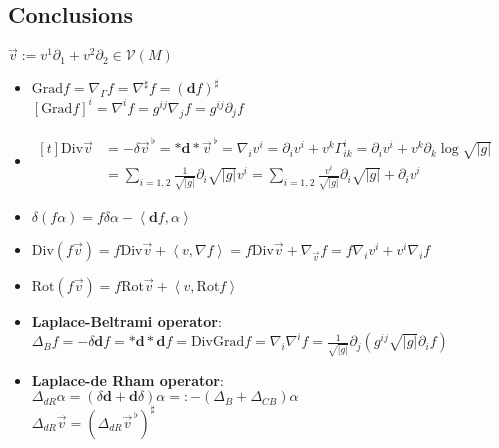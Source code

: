 \documentclass{scrartcl}
\newcommand{\exd}{\mathbf{d}}
\newcommand{\vecflat}[1]{\vec{#1}^{\,\flat}}
\begin{document}
    \subsection{Conclusions}
    \(  \vec{v} := v^{1}\partial_{1} + v^{2}\partial_{2}\in\mathcal{V}(M) \)
    \begin{itemize}
      \item \( \text{Grad}f = \nabla_{\Gamma}f = \nabla^{\sharp}f = \left( \exd f \right)^{\sharp} \)\\
            \( \left[  \text{Grad}f \right]^{i} = \nabla^{i}f =g^{ij}\nabla_{j} f = g^{ij}\partial_{j}f \)
      \item \(
        \begin{aligned}[t]
            \text{Div}\vec{v} &= -\delta\vecflat{v} = *\exd * \vecflat{v} = \nabla_{i}v^{i}
                               = \partial_{i}v^{i} + v^{k}\Gamma_{ik}^{i} 
                               = \partial_{i}v^{i} + v^{k}\partial_{k}\log\sqrt{|g|}\\
                                 &= \sum_{i=1,2} \frac{1}{\sqrt{|g|}}\partial_{i} \sqrt{|g|} v^{i}
                                 = \sum_{i=1,2} \frac{v^{i}}{\sqrt{|g|}}\partial_{i} \sqrt{|g|} + \partial_{i}v^{i}
        \end{aligned}\)\\
      \item
        \( \delta\left( f\alpha \right) = f\delta\alpha - \left\langle \exd f , \alpha \right\rangle \)
      \item
        \( \text{Div} (f\vec{v}) = f\text{Div}\vec{v} + \left\langle v, \nabla f \right\rangle = f\text{Div}\vec{v} + \nabla_{\vec{v}}f = f\nabla_{i}v^{i} + v^{i}\nabla_{i}f  \)
      \item \(  \text{Rot} (f\vec{v}) = f\text{Rot}\vec{v} + \left\langle v, \text{Rot} f \right\rangle \)
      \item \textbf{Laplace-Beltrami operator}:\\
        \( \Delta_{B}f = -\delta\exd f = *\exd *\exd f = \text{Div}\text{Grad}f = \nabla_{i}\nabla^{i} f
                      = \frac{1}{\sqrt{|g|}}\partial_{j}\left( g^{ij}\sqrt{|g|}\partial_{i}f \right) \)
      \item \textbf{Laplace-de Rham operator}:\\
        \( \Delta_{dR}\alpha = \left( \delta\exd + \exd\delta \right)\alpha =:  -\left( \Delta_{B} + \Delta_{CB} \right)\alpha \)\\
        \( \Delta_{dR}\vec{v} = \left( \Delta_{dR}\vecflat{v} \right)^{\sharp} \)

\end{itemize}
\end{document}
